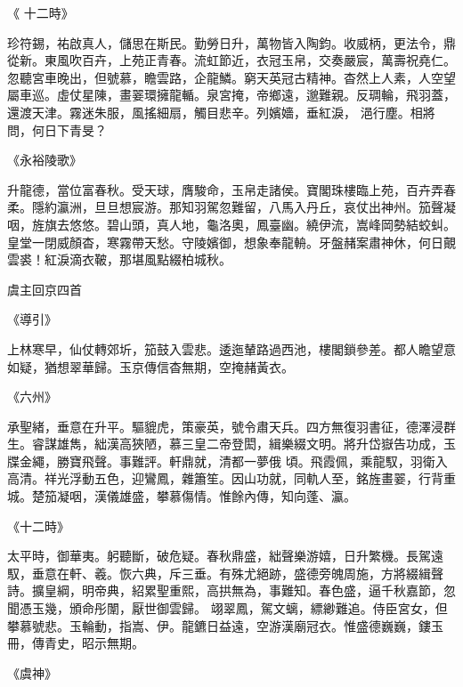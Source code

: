 \begin{pinyinscope}
 《
 十二時》



 珍符錫，祐啟真人，儲思在斯民。勤勞日升，萬物皆入陶鈞。收威柄，更法令，鼎從新。東風吹百卉，上苑正青春。流虹節近，衣冠玉帛，交奏嚴宸，萬壽祝堯仁。忽聽宮車晚出，但號慕，瞻雲路，企龍鱗。窮天英冠古精神。杳然上人素，人空望屬車巡。虛仗星陳，畫翣環擁龍輴。泉宮掩，帝鄉遠，邈難親。反琱輪，飛羽蓋，還渡天津。霧迷朱服，風搖細扇，觸目悲辛。列嬪嬙，垂紅淚，
 浥行塵。相將問，何日下青旻？



 《永裕陵歌》



 升龍德，當位富春秋。受天球，膺駿命，玉帛走諸侯。寶閣珠樓臨上苑，百卉弄春柔。隱約瀛洲，旦旦想宸游。那知羽駕忽難留，八馬入丹丘，哀仗出神州。笳聲凝咽，旌旗去悠悠。碧山頭，真人地，龜洛奧，鳳臺幽。繞伊流，嵩峰岡勢結蛟虯。皇堂一閉威顏杳，寒霧帶天愁。守陵嬪御，想象奉龍輈。牙盤赭案肅神休，何日覿雲裘！紅淚滴衣鞁，那堪風點綴柏城秋。



 虞主回京四首



 《導引》



 上林寒早，仙仗轉郊圻，笳鼓入雲悲。逶迤輦路過西池，樓閣鎖參差。都人瞻望意如疑，猶想翠華歸。玉京傳信杳無期，空掩赭黃衣。



 《六州》



 承聖緒，垂意在升平。驅貔虎，策豪英，號令肅天兵。四方無復羽書征，德澤浸群生。睿謀雄雋，絀漢高狹陋，慕三皇二帝登閎，緝樂綴文明。將升岱嶽告功成，玉牒金繩，勝寶飛聲。事難評。軒鼎就，清都一夢俄
 頃。飛霞佩，乘龍馭，羽衛入高清。祥光浮動五色，迎鸞鳳，雜簫笙。因山功就，同軌人至，銘旌畫翣，行背重城。楚笳凝咽，漢儀雄盛，攀慕傷情。惟餘內傳，知向蓬、瀛。



 《十二時》



 太平時，御華夷。躬聽斷，破危疑。春秋鼎盛，絀聲樂游嬉，日升繁機。長駕遠馭，垂意在軒、羲。恢六典，斥三垂。有殊尤絕跡，盛德旁魄周施，方將綴緝聲詩。擴皇綱，明帝典，紹累聖重熙，高拱無為，事難知。春色盛，逼千秋嘉節，忽聞憑玉幾，頒命彤闈，厭世御雲歸。
 翊翠鳳，駕文螭，縹緲難追。侍臣宮女，但攀慕號悲。玉輪動，指嵩、伊。龍鑣日益遠，空游漢廟冠衣。惟盛德巍巍，鏤玉冊，傳青史，昭示無期。



 《虞神》




\end{pinyinscope}
